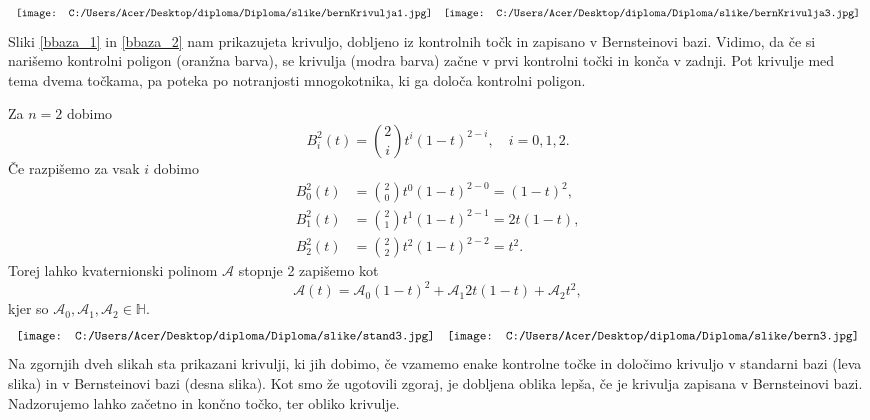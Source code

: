 \documentclass[mat1]{fmfdelo}
\newcommand{\HH}{\mathbb H}
\newcommand{\A}{\mathcal A}
\begin{document}
\begin{equation*}
\begin{array}{c c}
\texttt{[image: C:/Users/Acer/Desktop/diploma/Diploma/slike/bernKrivulja1.jpg]} &
\texttt{[image: C:/Users/Acer/Desktop/diploma/Diploma/slike/bernKrivulja3.jpg]}
\end{array}
\end{equation*}
Sliki \ref{bbaza_1} in \ref{bbaza_2} nam prikazujeta krivuljo, dobljeno iz kontrolnih točk in zapisano v Bernsteinovi bazi. Vidimo, da če si narišemo kontrolni poligon (oranžna barva), se krivulja (modra barva) začne v prvi kontrolni točki in konča v zadnji. Pot krivulje med tema dvema točkama, pa poteka po notranjosti mnogokotnika, ki ga določa kontrolni poligon.
\iffalse
Primer prileganja krivulje kontrolnemu poligoni na točkah (0,0), (1,1), (2,-1), (0,-3), (-2,2) in če dodamo še (3,2).
\fi
\begin{primer}Za $n = 2$ dobimo
\begin{equation*}
B_i^2(t) = \binom{2}{i} t^i(1-t)^{2-i}, \quad i=0,1,2.
\end{equation*}
Če razpišemo za vsak $i$ dobimo
\begin{equation*}
\begin{split}
B_0^2(t) &= \binom{2}{0} t^0(1-t)^{2-0} = (1-t)^2,\\
B_1^2(t) &= \binom{2}{1} t^1(1-t)^{2-1} = 2t(1-t),\\
B_2^2(t) &= \binom{2}{2} t^2(1-t)^{2-2} = t^2.
\end{split}
\end{equation*}
Torej lahko kvaternionski polinom $\A$ stopnje 2 zapišemo kot
\begin{equation*}
	\A(t) = \A_0(1-t)^2 + \A_1 2t(1-t) + \A_2t^2,
\end{equation*}
kjer so $\A_0, \A_1, \A_2 \in \HH$. 
\begin{equation*}
\begin{array}{c c}
\texttt{[image: C:/Users/Acer/Desktop/diploma/Diploma/slike/stand3.jpg]} &
\texttt{[image: C:/Users/Acer/Desktop/diploma/Diploma/slike/bern3.jpg]}
\end{array}
\end{equation*}
Na zgornjih dveh slikah sta prikazani krivulji, ki jih dobimo, če vzamemo enake kontrolne točke in določimo krivuljo v standarni bazi (leva slika) in v Bernsteinovi bazi (desna slika). Kot smo že ugotovili zgoraj, je dobljena oblika lepša, če je krivulja zapisana v Bernsteinovi bazi. Nadzorujemo lahko začetno in končno točko, ter obliko krivulje.
\iffalse
primer polinoma zapisanega v standardni bazi in bernsteinovi bazi, z istimi kontrolnimi točkami (-1,0), (0,1), (1,0).
\fi
\end{primer}
\end{document}
